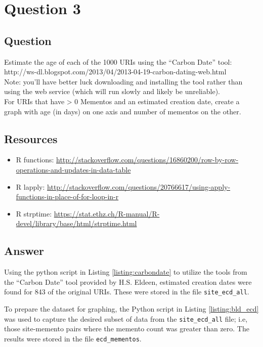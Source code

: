 \section{Question 3}

\subsection{Question}
Estimate the age of each of the 1000 URIs using the ``Carbon Date'' tool:\\

http://ws-dl.blogspot.com/2013/04/2013-04-19-carbon-dating-web.html\\

Note: you'll have better luck downloading and installing the tool 
rather than using the web service (which will run slowly and likely
be unreliable).\\

For URIs that have > 0 Mementos and an estimated creation date,
create a graph with age (in days) on one axis and number of mementos
on the other.\\

\subsection{Resources}
\begin{itemize}
\item R functions: \url{http://stackoverflow.com/questions/16860200/row-by-row-operations-and-updates-in-data-table}
\item R lapply: \url{http://stackoverflow.com/questions/20766617/using-apply-functions-in-place-of-for-loop-in-r}
\item R strptime: \url{https://stat.ethz.ch/R-manual/R-devel/library/base/html/strptime.html}
\end{itemize}

\subsection{Answer}
Using the python script in Listing \ref{listing:carbondate} to utilize the tools from the 
``Carbon Date'' tool provided by H.S. Eldeen, estimated creation dates were found for
843 of the original URIs. These were stored in the file {\tt site\_ecd\_all}.



To prepare the dataset for graphing, the Python script in Listing \ref{listing:bld_ecd} was used to capture the desired subset of data from the {\tt site\_ecd\_all} file; i.e, those site-memento pairs where the memento count was greater than zero. The results were stored in the file {\tt ecd\_mementos}. 

